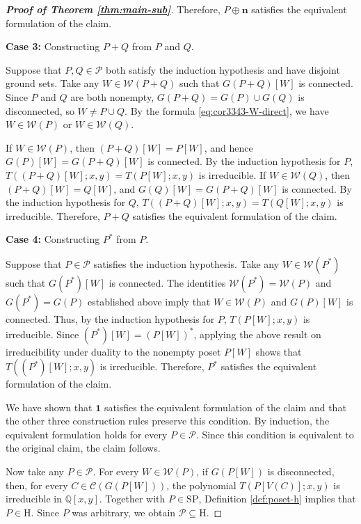 \documentclass[11pt,a4paper]{article}
\begin{document}
\begin{proof}[\rm\textbf{Proof of Theorem \ref{thm:main-sub}}]
Therefore, $P\oplus\mathbf n$ satisfies
the equivalent formulation of the claim.

\textbf{Case 3:} Constructing $P+Q$ from $P$ and $Q$.

Suppose that $P,Q\in\mathcal P$ both satisfy the induction hypothesis
and have disjoint ground sets.
Take any $W\in\mathcal W(P+Q)$ such that
$G(P+Q)[W]$ is connected.
Since $P$ and $Q$ are both nonempty,
$G(P+Q)=G(P)\cup G(Q)$ is disconnected,
so $W\neq P\cup Q$.
By the formula \eqref{eq:cor3343-W-direct},
we have $W\in\mathcal W(P)$ or $W\in\mathcal W(Q)$.

If $W\in\mathcal W(P)$, then $(P+Q)[W]=P[W]$,
and hence $G(P)[W]=G(P+Q)[W]$ is connected.
By the induction hypothesis for $P$,
$T((P+Q)[W];x,y)=T(P[W];x,y)$ is irreducible.
If $W\in\mathcal W(Q)$, then $(P+Q)[W]=Q[W]$,
and $G(Q)[W]=G(P+Q)[W]$ is connected.
By the induction hypothesis for $Q$,
$T((P+Q)[W];x,y)=T(Q[W];x,y)$ is irreducible.
Therefore, $P+Q$ satisfies the equivalent formulation of the claim.

\textbf{Case 4:} Constructing $P^*$ from $P$.

Suppose that $P\in\mathcal P$ satisfies the induction hypothesis.
Take any $W\in\mathcal W(P^*)$ such that $G(P^*)[W]$ is connected.
The identities $\mathcal W(P^*)=\mathcal W(P)$
and $G(P^*)=G(P)$ established above imply that
$W\in\mathcal W(P)$ and $G(P)[W]$ is connected.
Thus, by the induction hypothesis for $P$,
$T(P[W];x,y)$ is irreducible.
Since $(P^*)[W]=(P[W])^*$,
applying the above result on irreducibility under duality
to the nonempty poset $P[W]$ shows that
$T((P^*)[W];x,y)$ is irreducible.
Therefore, $P^*$ satisfies the equivalent formulation of the claim.

We have shown that $\mathbf1$ satisfies
the equivalent formulation of the claim
and that the other three construction rules preserve this condition.
By induction, the equivalent formulation holds
for every $P\in\mathcal P$.
Since this condition is equivalent to the original claim,
the claim follows.

Now take any $P\in\mathcal P$.
For every $W\in\mathcal W(P)$, if $G(P[W])$ is disconnected,
then, for every $C\in\mathcal C(G(P[W]))$,
the polynomial $T(P[V(C)];x,y)$
is irreducible in $\mathbb Q[x,y]$.
Together with $P\in\mathrm{SP}$,
Definition \ref{def:poset-h} implies that $P\in\mathrm H$.
Since $P$ was arbitrary, we obtain $\mathcal P\subseteq\mathrm H$.
\end{proof}
\end{document}
